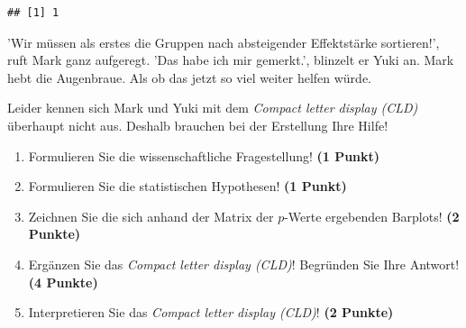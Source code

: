 \documentclass[a4paper, 9pt]{scrartcl}\usepackage[]{graphicx}\usepackage[]{xcolor}
\makeatletter
\newenvironment{kframe}{%
 \def\at@end@of@kframe{}%
 \ifinner\ifhmode%
  \def\at@end@of@kframe{\end{minipage}}%
  \begin{minipage}{\columnwidth}%
 \fi\fi%
 \def\FrameCommand##1{\hskip\@totalleftmargin \hskip-\fboxsep
 \colorbox{shadecolor}{##1}\hskip-\fboxsep
     \hskip-\linewidth \hskip-\@totalleftmargin \hskip\columnwidth}%
 \MakeFramed {\advance\hsize-\width
   \@totalleftmargin\z@ \linewidth\hsize
   \@setminipage}}%
 {\par\unskip\endMakeFramed%
 \at@end@of@kframe}
\newenvironment{knitrout}{}{} %
\makeatother
\begin{document}
\begin{knitrout}
\color{fgcolor}\begin{kframe}
\begin{verbatim}
## [1] 1
\end{verbatim}
\end{kframe}
\end{knitrout}

'Wir müssen als erstes die Gruppen nach absteigender Effektstärke sortieren!', ruft Mark ganz aufgeregt. 'Das habe ich mir gemerkt.', blinzelt er Yuki an. Mark hebt die Augenbraue. Als ob das jetzt so viel weiter helfen würde.

\begin{knitrout}
\color{fgcolor}\begin{kframe}


{\ttfamily\noindent\bfseries\color{errorcolor}{\#\# Error in matrix(pairwise.t.test(data\_tbl\$freshmatter, data\_tbl\$treatment, : length of 'dimnames' [1] not equal to array extent}}

{\ttfamily\noindent\bfseries\color{errorcolor}{\#\# Error: object 'pair\_wise\_mat' not found}}

{\ttfamily\noindent\bfseries\color{errorcolor}{\#\# Error in eval(expr, envir, enclos): object 'pair\_wise\_mat' not found}}\end{kframe}
\end{knitrout}

Leider kennen sich Mark und Yuki mit dem \textit{Compact letter display (CLD)} überhaupt nicht aus. Deshalb brauchen bei der Erstellung Ihre Hilfe!  

\begin{enumerate}
  \item Formulieren Sie die wissenschaftliche Fragestellung! \textbf{(1 Punkt)}
  \item Formulieren Sie die statistischen Hypothesen! \textbf{(1 Punkt)}
\item Zeichnen Sie die sich anhand der Matrix der $p$-Werte ergebenden Barplots! \textbf{(2 Punkte)}
\item Ergänzen Sie das \textit{Compact letter display (CLD)}! Begründen Sie Ihre Antwort! \textbf{(4 Punkte)}
\item Interpretieren Sie das \textit{Compact letter display (CLD)}! \textbf{(2 Punkte)} 
\end{enumerate}

 
\clearpage
\end{document}
